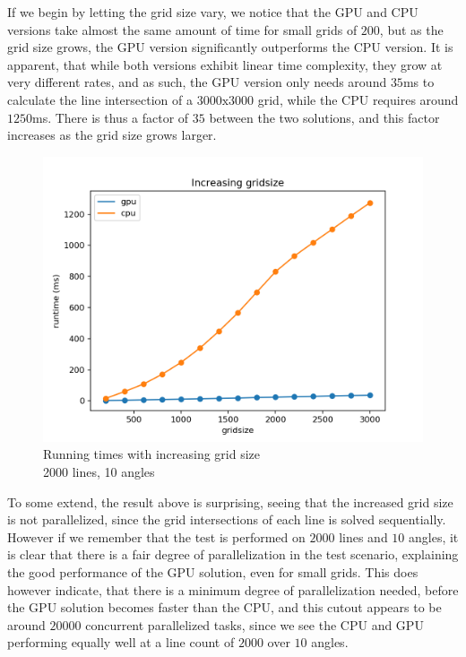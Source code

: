 If we begin by letting the grid size vary, we notice that the GPU and CPU versions take almost the same amount of time for small grids of $200$, but as the grid size grows, the GPU version significantly outperforms the CPU version. It is apparent, that while both versions exhibit linear time complexity, they grow at very different rates, and as such, the GPU version only needs around $35$ms to calculate the line intersection of a $3000\text{x}3000$ grid, while the CPU requires around $1250$ms. There is thus a factor of $35$ between the two solutions, and this factor increases as the grid size grows larger. 
\begin{figure}[H]
    \centering
    \captionsetup{justification=centering,margin=2cm}
    \includegraphics[scale=0.6]{figures/gridsizeGPU_gridsizeCPU.png}
    \caption[caption]{Running times with increasing grid size\\\hspace{\textwidth}2000 lines, 10 angles}
\end{figure}
To some extend, the result above is surprising, seeing that the increased grid size is not parallelized, since the grid intersections of each line is solved sequentially. However if we remember that the test is performed on $2000$ lines and $10$ angles, it is clear that there is a fair degree of parallelization in the test scenario, explaining the good performance of the GPU solution, even for small grids. This does however indicate, that there is a minimum degree of parallelization needed, before the GPU solution becomes faster than the CPU, and this cutout appears to be around $20000$ concurrent parallelized tasks, since we see the CPU and GPU performing equally well at a line count of $2000$ over $10$ angles.

